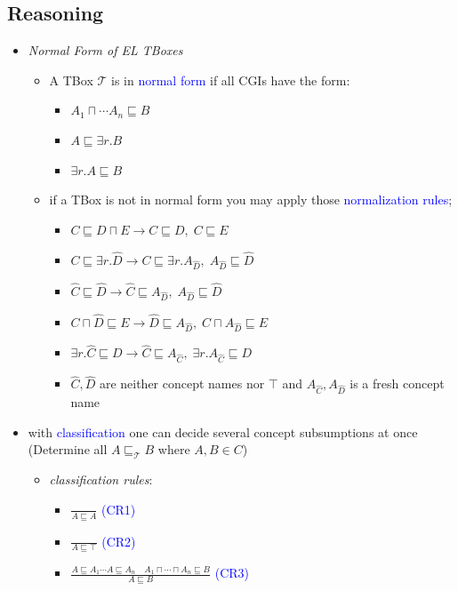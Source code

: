 \documentclass[12pt,a4paper]{article}
\newcommand{\blue}[1]{\textcolor{blue} {#1}}
\newcommand{\sse}{\sqsubseteq}
\newcommand{\sand}{\sqcap}
\begin{document}
\subsection{Reasoning}
\begin{itemize}
\item \textit{Normal Form of EL TBoxes}
\begin{itemize}
\item A TBox $\mathcal{T}$ is in \blue{normal form} if all CGIs have the form:
\begin{itemize}
\item $A_1 \sand \cdots A_n \sse B$
\item $A \sse \exists r.B$
\item $\exists r.A \sse B$
\end{itemize}
\item if a TBox is not in normal form you may apply those \blue{normalization rules};
\begin{itemize}
\item $C \sse D \sand E \rightarrow C \sse D, \; C\sse E$
\item $C\sse \exists r.\hat{D} \rightarrow C \sse \exists r. A_{\hat{D}},\; A_{\hat{D}} \sse \hat{D}$
\item $\hat{C} \sse \hat{D} \rightarrow \hat{C} \sse A_{\hat{D}}, \; A_{\hat{D}} \sse \hat{D}$
\item $C \sand \hat{D} \sse E \rightarrow \hat{D} \sse A_{\hat{D}}, \; C\sand A_{\hat{D}} \sse E$
\item $\exists r.\hat{C} \sse D \rightarrow \hat{C} \sse A_{\hat{C}} , \; \exists r.A_{\hat{C}} \sse D$
\item $\hat{C}, \hat{D}$ are neither concept names nor $\top$ and $A_{\hat{C}}, A_{\hat{D}}$ is a fresh concept name
\end{itemize}
\end{itemize}
\item with \blue{classification} one can decide several concept subsumptions at once\\(Determine all $A \sse_{\mathcal{T}} B$ where $A,B \in C$)
\begin{itemize}
\item \textit{classification rules}:
\begin{itemize}
\item $\displaystyle\frac{}{A\sse A}$ \blue{(CR1)}
\item $\displaystyle\frac{}{A\sse\top}$ \blue{(CR2)}
\item $\displaystyle\frac{A\sse A_1 \cdots A\sse A_n \quad A_1\sand\cdots\sand A_n \sse B}{A\sse B}$ \blue{(CR3)}

\end{itemize}
\end{itemize}
\end{itemize}
\end{document}

